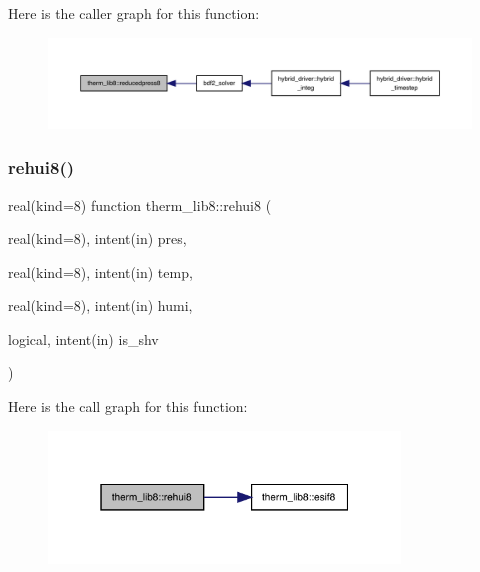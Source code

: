 Here is the caller graph for this function\+:
\nopagebreak
\begin{figure}[H]
\begin{center}
\leavevmode
\includegraphics[width=350pt]{namespacetherm__lib8_ad325dbfaa9ff36bd492b23150ffd2dc0_icgraph}
\end{center}
\end{figure}
\mbox{\label{namespacetherm__lib8_aab9071671edac02a14988c3f5724aa51}} 
\subsubsection{\texorpdfstring{rehui8()}{rehui8()}}
{\footnotesize\ttfamily real(kind=8) function therm\+\_\+lib8\+::rehui8 (\begin{DoxyParamCaption}\item[{real(kind=8), intent(in)}]{pres,  }\item[{real(kind=8), intent(in)}]{temp,  }\item[{real(kind=8), intent(in)}]{humi,  }\item[{logical, intent(in)}]{is\+\_\+shv }\end{DoxyParamCaption})}

Here is the call graph for this function\+:
\nopagebreak
\begin{figure}[H]
\begin{center}
\leavevmode
\includegraphics[width=265pt]{namespacetherm__lib8_aab9071671edac02a14988c3f5724aa51_cgraph}
\end{center}
\end{figure}
\mbox{\label{namespacetherm__lib8_a51fbba130b3fc3a6cc1744aeb76a2b81}} 
